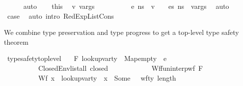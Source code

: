 \begin{isabellebody}
\ \ \ \ \isamarkupfalse%
\ auto\isanewline
\ \ \isamarkupfalse%
\ this\ \isamarkupfalse%
\ v\ vargs\ \ \isanewline
\ \ \ \ \ \ {\isachardoublequoteopen}{\isasymLambda}{\isacharcomma}{\kern0pt}{\isasymGamma}{\isacharcomma}{\kern0pt}{\isasymOmega}\ {\isasymturnstile}\ {\isasymlangle}e{\isacharcomma}{\kern0pt}\ n{\isacharunderscore}{\kern0pt}s{\isasymrangle}\ {\isasymDown}\ v{\isachardoublequoteclose}\ \ {\isachardoublequoteopen}{\isasymLambda}{\isacharcomma}{\kern0pt}{\isasymGamma}{\isacharcomma}{\kern0pt}{\isasymOmega}\ {\isasymturnstile}\ {\isasymlangle}es{\isacharcomma}{\kern0pt}\ n{\isacharunderscore}{\kern0pt}s{\isasymrangle}\ {\isacharbrackleft}{\kern0pt}{\isasymDown}{\isacharbrackright}{\kern0pt}\ vargs{\isachardoublequoteclose}\ \isamarkupfalse%
\ auto\isanewline
\ \ \isamarkupfalse%
\ {\isacharquery}{\kern0pt}case\ \isamarkupfalse%
\ {\isacharparenleft}{\kern0pt}auto\ intro{\isacharcolon}{\kern0pt}\ RedExpListCons{\isacharparenright}{\kern0pt}\isanewline
{}\isamarkupfalse%
%
\endisatagproof
{\isafoldproof}%
%
\isadelimproof
%
\endisadelimproof
%
\begin{isamarkuptext}%
We combine type preservation and type progress to get a top-level type safety theorem%
\end{isamarkuptext}\isamarkuptrue%
\isamarkupfalse%
\ type{\isacharunderscore}{\kern0pt}safety{\isacharunderscore}{\kern0pt}top{\isacharunderscore}{\kern0pt}level{\isacharcolon}{\kern0pt}\isanewline
\ \ \ {\isachardoublequoteopen}F{\isacharcomma}{\kern0pt}\ {\isacharparenleft}{\kern0pt}lookup{\isacharunderscore}{\kern0pt}var{\isacharunderscore}{\kern0pt}ty\ {\isasymLambda}{\isacharcomma}{\kern0pt}\ Map{\isachardot}{\kern0pt}empty{\isacharparenright}{\kern0pt}\ {\isasymturnstile}\ e\ {\isacharcolon}{\kern0pt}\ {\isasymtau}{\isachardoublequoteclose}\ \isanewline
\ \ \ \ \ \ \ \ \ \ ClosedEnv{\isacharcolon}{\kern0pt}{\isachardoublequoteopen}list{\isacharunderscore}{\kern0pt}all\ closed\ {\isasymOmega}{\isachardoublequoteclose}\ \isanewline
\ \ \ \ \ \ \ \ \ \ Wf{\isacharunderscore}{\kern0pt}{\isasymGamma}{\isacharcolon}{\kern0pt}{\isachardoublequoteopen}fun{\isacharunderscore}{\kern0pt}interp{\isacharunderscore}{\kern0pt}wf\ F\ {\isasymGamma}{\isachardoublequoteclose}\ \isanewline
\ \ \ \ \ \ \ \ \ \ Wf{\isacharunderscore}{\kern0pt}{\isasymLambda}{\isacharcolon}{\kern0pt}\ {\isachardoublequoteopen}{\isasymforall}x\ {\isasymtau}{\isachardot}{\kern0pt}\ lookup{\isacharunderscore}{\kern0pt}var{\isacharunderscore}{\kern0pt}ty\ {\isasymLambda}\ x\ {\isacharequal}{\kern0pt}\ Some\ {\isasymtau}\ {\isasymlongrightarrow}\ wf{\isacharunderscore}{\kern0pt}ty\ {\isacharparenleft}{\kern0pt}length\ {\isasymOmega}{\isacharparenright}{\kern0pt}\ {\isasymtau}{\isachardoublequoteclose}\ \isanewline

\end{isabellebody}
